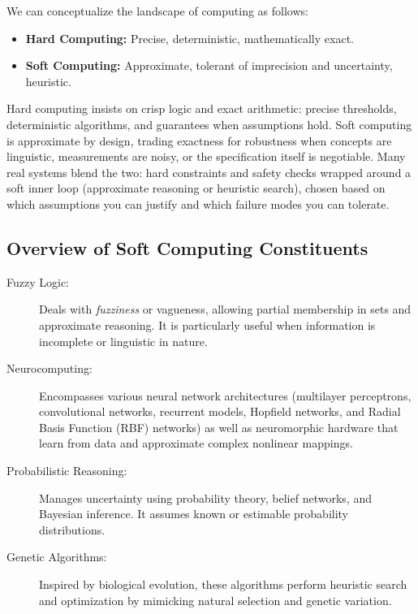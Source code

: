 We can conceptualize the landscape of computing as follows:
\begin{itemize}
    \item \textbf{Hard Computing:} Precise, deterministic, mathematically exact.
    \item \textbf{Soft Computing:} Approximate, tolerant of imprecision and uncertainty, heuristic.
\end{itemize}

Hard computing insists on crisp logic and exact arithmetic: precise thresholds, deterministic algorithms, and guarantees when assumptions hold. Soft computing is approximate by design, trading exactness for robustness when concepts are linguistic, measurements are noisy, or the specification itself is negotiable. Many real systems blend the two: hard constraints and safety checks wrapped around a soft inner loop (approximate reasoning or heuristic search), chosen based on which assumptions you can justify and which failure modes you can tolerate.

\subsection{Overview of Soft Computing Constituents}
\label{sec:softcomp_overview_of_soft_computing_constituents}

\begin{description}
    \item[Fuzzy Logic:] Deals with \emph{fuzziness} or vagueness, allowing partial membership in sets and approximate reasoning. It is particularly useful when information is incomplete or linguistic in nature.

    \item[Neurocomputing:] Encompasses various neural network architectures (multilayer perceptrons, convolutional networks, recurrent models, Hopfield networks, and Radial Basis Function (RBF) networks) as well as neuromorphic hardware that learn from data and approximate complex nonlinear mappings.

    \item[Probabilistic Reasoning:] Manages uncertainty using probability theory, belief networks, and Bayesian inference. It assumes known or estimable probability distributions.

    \item[Genetic Algorithms:] Inspired by biological evolution, these algorithms perform heuristic search and optimization by mimicking natural selection and genetic variation.
\end{description}


